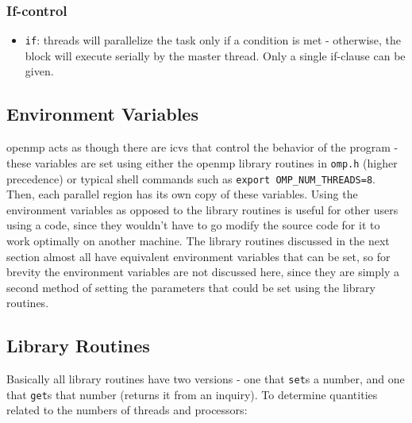 \documentclass[10pt]{article}
\begin{document}
\begin{flushleft}
\subsubsection{If-control}

\begin{itemize}
\item {\tt if}: threads will parallelize the task only if a condition is met - otherwise, the block will execute serially by the master thread. Only a single if-clause can be given. 
\end{itemize}

\subsection{Environment Variables}

\gls{openmp} acts as though there are \gls{icv}s that control the behavior of the program - these variables are set using either the \gls{openmp} library routines in {\tt omp.h} (higher precedence) or typical shell commands such as {\tt export OMP\_NUM\_THREADS=8}. Then, each parallel region has its own copy of these variables. Using the environment variables as opposed to the library routines is useful for other users using a code, since they wouldn't have to go modify the source code for it to work optimally on another machine. The library routines discussed in the next section almost all have equivalent environment variables that can be set, so for brevity the environment variables are not discussed here, since they are simply a second method of setting the parameters that could be set using the library routines.

\subsection{Library Routines}

Basically all library routines have two versions - one that {\tt set}s a number, and one that {\tt get}s that number (returns it from an inquiry). To determine quantities related to the numbers of threads and processors:


\end{flushleft}
\end{document}
